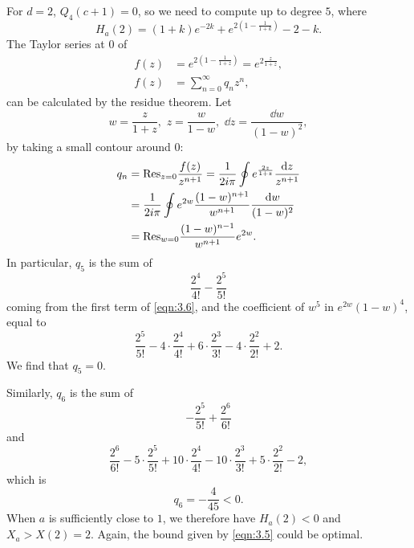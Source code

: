 For $d = 2$, $Q_4(c+1) = 0$, so we need to compute up to degree $5$, where
\begin{equation}
    \label{eqn:3.6}
    H_a(2) = (1+k)e^{-2k} + e^{2(1 - \frac{1}{1+k})} - 2 - k.
\end{equation}
The Taylor series at $0$ of
\begin{align*}
    f(z) &= e^{2(1 - \frac{1}{1+z})} = e^{2\frac{z}{1+z}},\\
    f(z) &= \sum_{n=0}^{\infty} q_n z^n,
\end{align*}
can be calculated by the residue theorem.
Let
\[
    w = \frac{z}{1+z}, \,\,z = \frac{w}{1-w}, \,\,\dd z = \frac{\dd w}{(1-w)^2},
\]
by taking a small contour around $0$:
\begin{align*}
    q_n &= \mathrm{Res}_{z=0} \frac{f(z)}{z^{n+1}} = \frac{1}{2 i \pi} \oint e^{\frac{2z}{1+z}} \frac{\mathrm{d} z}{z^{n+1}} \\
    &= \frac{1}{2 i \pi} \oint e^{2w} \frac{(1-w)^{n+1}}{w^{n+1}} \frac{\mathrm{d} w}{(1-w)^{2}} \\
    &= \mathrm{Res}_{w=0} \frac{(1-w)^{n-1}}{w^{n+1}} e^{2w}.
\end{align*}
In particular, $q_5$ is the sum of
\begin{equation}
    \label{eqn:3.7}
    \frac{2^4}{4!} - \frac{2^5}{5!}
\end{equation}
coming from the first term of \eqref{eqn:3.6}, and the coefficient of $w^5$ in $e^{2w}(1-w)^{4}$, equal to
\begin{equation}
    \label{eqn:3.8}
    \frac{2^5}{5!} - 4 \cdot \frac{2^4}{4!} +  6 \cdot \frac{2^3}{3!} - 4 \cdot \frac{2^2}{2!} + 2.
\end{equation}
We find that $q_5 = 0$.

Similarly, $q_6$ is the sum of
\begin{equation}
    \label{eqn:3.9}
    -\frac{2^5}{5!} + \frac{2^6}{6!}
\end{equation}
and
\begin{equation}
    \label{eqn:3.10}
    \frac{2^6}{6!} - 5 \cdot \frac{2^5}{5!} + 10 \cdot \frac{2^4}{4!} - 10 \cdot \frac{2^3}{3!} + 5 \cdot \frac{2^2}{2!} - 2,
\end{equation}
which is
\[
    q_6 = -\frac{4}{45} < 0.
\]
When $a$ is sufficiently close to $1$, we therefore have $H_a(2) < 0$ and $X_a > X(2) = 2$.
Again, the bound given by \eqref{eqn:3.5} could be optimal.

